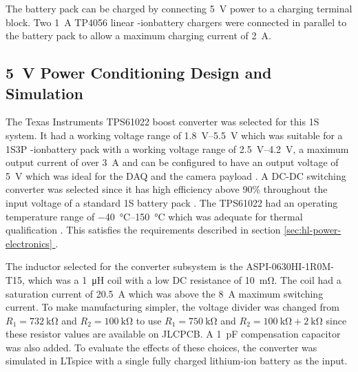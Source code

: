 \documentclass{report}
\newcommand*{\secref}[1]{section \hyperref[{#1}]{\ref*{#1} \nameref*{#1}}}
\newcommand{\liion}{\ce{Li}-ion}
\begin{document}
The battery pack can be charged by connecting \SI{5}{\volt} power to a charging terminal block. Two \SI{1}{\ampere} TP4056 linear \liion battery chargers were connected in parallel to the battery pack to allow a maximum charging current of \SI{2}{\ampere}.

\subsection{\SI{5}{\volt} Power Conditioning Design and Simulation}

The Texas Instruments TPS61022 boost converter was selected for this 1S system. It had a working voltage range of \SIrange{1.8}{5.5}{\volt} which was suitable for a 1S3P \liion battery pack with a working voltage range of \SIrange{2.5}{4.2}{\volt}, a maximum output current of over \SI{3}{\ampere} and can be configured to have an output voltage of \SI{5}{\volt} which was ideal for the DAQ and the camera payload \cite{ti2021tps61022}. A DC-DC switching converter was selected since it has high efficiency above 90\% throughout the input voltage of a standard 1S battery pack \cite{ti2021tps61022}. The TPS61022 had an operating temperature range of \SIrange{-40}{150}{\degreeCelsius} which was adequate for thermal qualification \cite{ti2021tps61022}. This satisfies the requirements described in \secref{sec:hl-power-electronics}.

The inductor selected for the converter subsystem is the ASPI-0630HI-1R0M-T15, which was a \SI{1}{\micro\henry} coil with a low DC resistance of \SI{10}{\milli\ohm}. The coil had a saturation current of \SI{20.5}{\ampere} which was above the \SI{8}{\ampere} maximum switching current. To make manufacturing simpler, the voltage divider was changed from $R_1=\SI{732}{\kilo\ohm}$ and $R_2=\SI{100}{\kilo\ohm}$ to use $R_1=\SI{750}{\kilo\ohm}$ and $R_2=\SI{100}{\kilo\ohm}+\SI{2}{\kilo\ohm}$ since these resistor values are available on JLCPCB. A \SI{1}{\pico\farad} compensation capacitor was also added. To evaluate the effects of these choices, the converter was simulated in LTspice with a single fully charged lithium-ion battery as the input.
\end{document}
